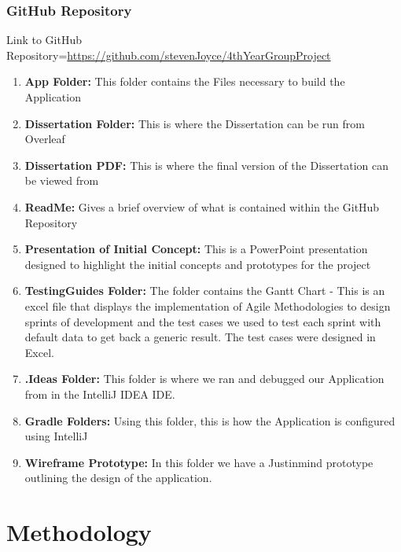 \subsection{GitHub Repository}
Link to GitHub Repository={\url{https://github.com/stevenJoyce/4thYearGroupProject}}
\newline
\begin{enumerate}
    \item \textbf{App Folder:}
    \newline This folder contains the Files necessary to build the Application
    \item \textbf{Dissertation Folder:}
    \newline This is where the Dissertation can be run from Overleaf
    \item \textbf{Dissertation PDF:}
    \newline This is where the final version of the Dissertation can be viewed from
    \item \textbf{ReadMe:}
    \newline Gives a brief overview of what is contained within the GitHub Repository
    \item \textbf{Presentation of Initial Concept:}
    \newline This is a PowerPoint presentation designed to highlight the initial concepts and prototypes for the project
    \item \textbf{TestingGuides Folder:}
    \newline The folder contains the Gantt Chart -  This is an excel file that displays the implementation of Agile Methodologies to design sprints of development and the test cases we used to test each sprint with default data to get back a generic result. The test cases were designed in Excel.
    \item \textbf{.Ideas Folder:}
    \newline This folder is where we ran and debugged our Application from in the IntelliJ IDEA IDE.
    \item \textbf{Gradle Folders:}
    \newline Using this folder, this is how the Application is configured using IntelliJ
    \item \textbf{Wireframe Prototype:}
    \newline In this folder we have a Justinmind prototype outlining the design of the application.
\end{enumerate}

\chapter{Methodology}
